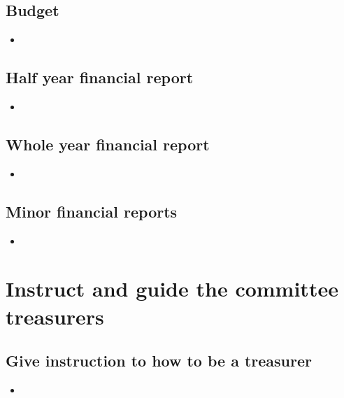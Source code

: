 \documentclass{report}
\begin{document}
\subsection{Budget}

\begin{itemize} 
\vspace{-1mm}
\itemsep-1mm 
\item 
\end{itemize}

\subsection{Half year financial report}

\begin{itemize} 
\vspace{-1mm}
\itemsep-1mm 
\item 
\end{itemize}

\subsection{Whole year financial report}

\begin{itemize} 
\vspace{-1mm}
\itemsep-1mm 
\item 
\end{itemize}

\subsection{Minor financial reports}

\begin{itemize} 
\vspace{-1mm}
\itemsep-1mm 
\item 
\end{itemize}

\section{Instruct and guide the committee treasurers}

\subsection{Give instruction to how to be a treasurer}
\begin{itemize} 
\vspace{-1mm}
\itemsep-1mm 
\item 
\end{itemize}
\end{document}
